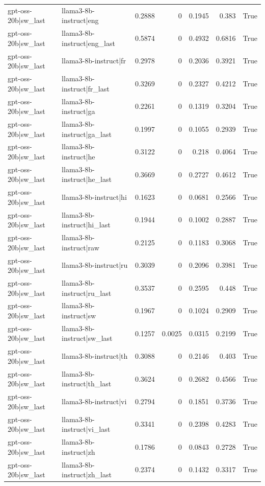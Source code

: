\begin{table}
\begin{tabular}{l l r r r r l}
gpt-oss-20b|sw_last & llama3-8b-instruct|eng & 0.2888 & 0 & 0.1945 & 0.383 & True \\
gpt-oss-20b|sw_last & llama3-8b-instruct|eng_last & 0.5874 & 0 & 0.4932 & 0.6816 & True \\
gpt-oss-20b|sw_last & llama3-8b-instruct|fr & 0.2978 & 0 & 0.2036 & 0.3921 & True \\
gpt-oss-20b|sw_last & llama3-8b-instruct|fr_last & 0.3269 & 0 & 0.2327 & 0.4212 & True \\
gpt-oss-20b|sw_last & llama3-8b-instruct|ga & 0.2261 & 0 & 0.1319 & 0.3204 & True \\
gpt-oss-20b|sw_last & llama3-8b-instruct|ga_last & 0.1997 & 0 & 0.1055 & 0.2939 & True \\
gpt-oss-20b|sw_last & llama3-8b-instruct|he & 0.3122 & 0 & 0.218 & 0.4064 & True \\
gpt-oss-20b|sw_last & llama3-8b-instruct|he_last & 0.3669 & 0 & 0.2727 & 0.4612 & True \\
gpt-oss-20b|sw_last & llama3-8b-instruct|hi & 0.1623 & 0 & 0.0681 & 0.2566 & True \\
gpt-oss-20b|sw_last & llama3-8b-instruct|hi_last & 0.1944 & 0 & 0.1002 & 0.2887 & True \\
gpt-oss-20b|sw_last & llama3-8b-instruct|raw & 0.2125 & 0 & 0.1183 & 0.3068 & True \\
gpt-oss-20b|sw_last & llama3-8b-instruct|ru & 0.3039 & 0 & 0.2096 & 0.3981 & True \\
gpt-oss-20b|sw_last & llama3-8b-instruct|ru_last & 0.3537 & 0 & 0.2595 & 0.448 & True \\
gpt-oss-20b|sw_last & llama3-8b-instruct|sw & 0.1967 & 0 & 0.1024 & 0.2909 & True \\
gpt-oss-20b|sw_last & llama3-8b-instruct|sw_last & 0.1257 & 0.0025 & 0.0315 & 0.2199 & True \\
gpt-oss-20b|sw_last & llama3-8b-instruct|th & 0.3088 & 0 & 0.2146 & 0.403 & True \\
gpt-oss-20b|sw_last & llama3-8b-instruct|th_last & 0.3624 & 0 & 0.2682 & 0.4566 & True \\
gpt-oss-20b|sw_last & llama3-8b-instruct|vi & 0.2794 & 0 & 0.1851 & 0.3736 & True \\
gpt-oss-20b|sw_last & llama3-8b-instruct|vi_last & 0.3341 & 0 & 0.2398 & 0.4283 & True \\
gpt-oss-20b|sw_last & llama3-8b-instruct|zh & 0.1786 & 0 & 0.0843 & 0.2728 & True \\
gpt-oss-20b|sw_last & llama3-8b-instruct|zh_last & 0.2374 & 0 & 0.1432 & 0.3317 & True \\

\end{tabular}
\end{table}
